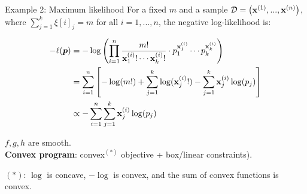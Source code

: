 \documentclass[11pt,compress,t,notes=noshow, xcolor=table]{beamer}
\begin{document}
\begin{frame2}{Example 2: Maximum likelihood}
For a fixed $m$ and a sample $\D = \left(\xi[1], ..., \xi[n]\right)$, where $\sum_{j = 1}^k \xi[i]_j = m$ for all $i = 1, ..., n$, the negative log-likelihood is:

$$
\begin{aligned}
- \ell(\bm{p}) &= - \log \left(\prod_{i = 1}^n  \frac{m!}{\xi_1! \cdots \xi_k!} \cdot p_1^{\xi_1} \cdots p_k^{\xi_k}    \right) \\
&= \sumin \left[- \log(m!) + \sum_{j = 1}^k \log(\xi_j!) - \sum_{j = 1}^k \xi_j \log(p_j)\right] \\
&\propto - \sumin \sum_{j = 1}^k \xi_j \log(p_j)
\end{aligned}
$$

$f, g, h$ are smooth.\\\textbf{Convex program}: convex$^{(*)}$ objective + box/linear constraints).

\vfill
\begin{footnotesize}
${(*)}$: $\log$ is concave, $- \log $ is convex, and the sum of convex functions is convex.
\end{footnotesize}

\end{frame2}


	




\end{document}

